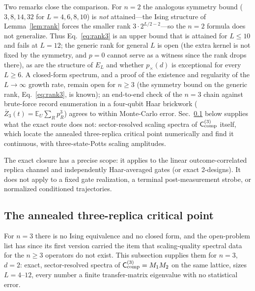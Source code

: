 \documentclass[aps,prx,reprint,superscriptaddress,nobibnotes,longbibliography]{revtex4-2}
\theoremstyle{remark}
\newcommand{\E}{\mathbb E}
\newcommand{\Ccomp}{\mathsf C_{\rm comp}}
\begin{document}
Two remarks close the comparison.  For $n=2$ the analogous symmetry bound ($3,8,14,32$ for $L=4,6,8,10$) is \emph{not} attained---the Ising structure of Lemma~\ref{lem:rank} forces the smaller rank $3\cdot2^{L/2-2}$---so the $n=2$ formula does not generalize.  Thus Eq.~\eqref{eq:rank3} is an upper bound that is attained for $L\le10$ and fails at $L=12$; the generic rank for general $L$ is open (the extra kernel is not fixed by the symmetry, and $p=0$ cannot serve as a witness since the rank drops there), as are the structure of $E_L$ and whether $p_\times(d)$ is exceptional for every $L\ge6$.  A closed-form spectrum, and a proof of the existence and regularity of the $L\to\infty$ growth rate, remain open for $n\ge3$ (the symmetry bound on the generic rank, Eq.~\eqref{eq:rank3}, is known); an end-to-end check of the $n=3$ chain against brute-force record enumeration in a four-qubit Haar brickwork ($\overline Z_3(t)=\E_U\sum_Rp_R^3$) agrees to within Monte-Carlo error.  Sec.~\ref{sec:n3annealed} below supplies what the exact route does not: sector-resolved scaling spectra of $\Ccomp^{(3)}$ itself, which locate the annealed three-replica critical point numerically and find it continuous, with three-state-Potts scaling amplitudes.

The exact closure has a precise scope: it applies to the linear outcome-correlated replica channel and independently Haar-averaged gates (or exact 2-designs).  It does not apply to a fixed gate realization, a terminal post-measurement strobe, or normalized conditioned trajectories.

\subsection{The annealed three-replica critical point}
\label{sec:n3annealed}

For $n=3$ there is no Ising equivalence and no closed form, and the open-problem list has since its first version carried the item that scaling-quality spectral data for the $n\ge3$ operators do not exist.  This subsection supplies them for $n=3$, $d=2$: exact, sector-resolved spectra of $\Ccomp^{(3)}=M_1M_2$ on the same lattice, sizes $L=4$--$12$, every number a finite transfer-matrix eigenvalue with no statistical error.
\end{document}
